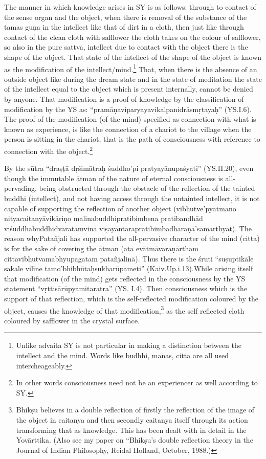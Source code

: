 The manner in which knowledge arises in SY is as follows: through to contact of the sense organ and the object, when there is removal of the substance of the tamas guṇa in the intellect like that of dirt in a cloth, then just like through contact of the clean cloth with safflower the cloth takes on the colour of safflower, so also in the pure sattva, intellect due to contact with the object there is the shape of the object. That state of the intellect of the shape of the object is known as the modification of the intellect/mind.\footnote{Unlike advaita SY is not particular in making a distinction between the intellect and the mind. Words like budhhi, manas, citta are all used intercheageably.} That, when there is the absence of an outside object like during  the dream state and in the state of meditation the state of the intellect equal to the object which is present internally, cannot be denied by anyone. That modification is a proof of knowledge by the classification of modification by the YS as: “pramāṇaviparyayavikalpanidrāsmṛtayaḥ” (YS.I.6). The proof of the modification (of the mind) specified as connection with what is known as experience, is like the connection of a chariot to the village when the person is sitting in the chariot; that is the path of consciousness with reference to connection with the object.\footnote{In other words consciousness need not be an experiencer as well according to SY.} 

By the sūtra “draṣṭā dṛśimātraḥ śuddho’pi pratyayānupaśyati” (YS.\break II.20), even though the immutable ātman of the nature of eternal consciousness is all-pervading, being obstructed through the obstacle of the reflection of the tainted buddhi (intellect), and not having access through the untainted intellect, it is not capable of supporting the reflection of another object (vibhutve’pyātmano nityacaitanyāvikāriṇo malinabuddhipratibimbena pratibandhād viśuddhabuddhidvāratām\break vinā viṣayāntarapratibimbadhāraṇā’sāmarthyāt). The reason why\break Patañjali has supported the all-pervasive character of the mind (citta) is for the sake of covering the ātman (ata evātmāvaraṇārtham cittavibhutvamabhyupagatam patañjalinā). Thus there is the śruti “suṣuptikāle sakale vilīne tamo’bhibhūtaḥsukharūpameti” (Kaiv.Up.i.13).\break While arising itself that modification (of the mind) gets reflected in the consciousness by the YS statement “vṛttisārūpyamitaratra” (YS. I.4). Then consciousness which is the support of that reflection, which is the self-reflected modification coloured by the object, causes the knowledge of that modification,\footnote{Bhikṣu believes in a double reflection of firstly the reflection of the image of the object in caitanya and then secondly caitanya itself through its action transforming that as knowledge. This has been dealt with in detail in the Yovārttika. (Also see my paper on “Bhikṣu’s double reflection theory in the Journal of Indian Philosophy, Reidal Holland, October, 1988.)} as the self reflected cloth coloured by safflower in the crystal surface. 

